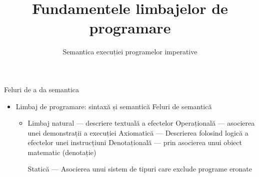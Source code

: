 \documentclass[xcolor=pdftex,romanian,colorlinks]{beamer}
\title{Fundamentele limbajelor de programare}
\subtitle{Semantica execuției programelor imperative}
\begin{document}
\begin{frame}
  \titlepage
\end{frame}

\begin{frame}{Feluri de a da semantica}
\begin{itemize}
  \item Limbaj de programare: sintaxă și semantică
  \vitem Feluri de semantică
  \begin{itemize}
  \item Limbaj natural --- descriere textuală a efectelor
  \vitem Operațională --- asocierea unei demonstrații a execuției
  \vitem Axiomatică --- Descrierea folosind logică a efectelor unei instrucțiuni
  \vitem Denotațională --- prin asocierea unui obiect matematic (denotație)

  \vitem Statică --- Asocierea unui sistem de tipuri care exclude programe eronate
  \end{itemize}
\end{itemize}
\end{frame}
\end{document}

